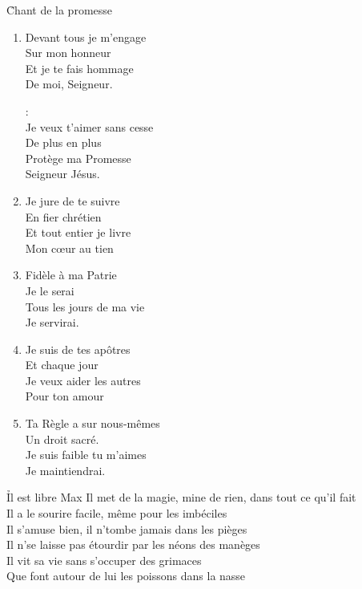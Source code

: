 \documentclass{novel}
\begin{document}
{{\begin{minipage}[b][0.60\textheight][t]{\textwidth}
\h*{Chant de la promesse}
\begin{multicols}{2}
\begin{enumerate}
\item Devant tous je m'engage\\
Sur mon honneur\\
Et je te fais hommage\\
De moi, Seigneur.\\

\begin{bfseries}
[Refrain]:\\
Je veux t'aimer sans cesse\\
De plus en plus\\
Protège ma Promesse\\
Seigneur Jésus.\\
\end{bfseries}

\item Je jure de te suivre\\
En fier chrétien\\
Et tout entier je livre\\
Mon cœur au tien\\

\item Fidèle à ma Patrie\\
Je le serai\\
Tous les jours de ma vie\\
Je servirai.\\


\item Je suis de tes apôtres\\
Et chaque jour\\
Je veux aider les autres\\
Pour ton amour\\

\item Ta Règle a sur nous-mêmes\\
Un droit sacré.\\
Je suis faible tu m'aimes\\
Je maintiendrai.\\
\end{enumerate}
\end{multicols}
    \end{minipage}
}
}
\newpage
\normalsize

\h*{Il est libre Max}
Il met de la magie, mine de rien, dans tout ce qu'il fait\\
Il a le sourire facile, même pour les imbéciles\\
Il s'amuse bien, il n'tombe jamais dans les pièges\\
Il n'se laisse pas étourdir par les néons des manèges\\
Il vit sa vie sans s'occuper des grimaces\\
Que font autour de lui les poissons dans la nasse\\
\end{document}
